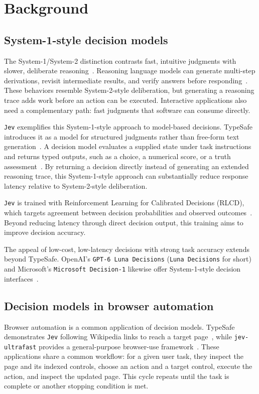 \documentclass{article}
\DeclareRobustCommand{\modelname}[1]{\texttt{#1}}
\begin{document}
\section{Background}
\subsection{System-1-style decision models}
The System-1/System-2 distinction contrasts fast, intuitive judgments with slower, deliberate reasoning~\cite{kahneman2011}. Reasoning language models can generate multi-step derivations, revisit intermediate results, and verify answers before responding~\cite{deepseek2025r1,wei2022cot}. These behaviors resemble System-2-style deliberation, but generating a reasoning trace adds work before an action can be executed. Interactive applications also need a complementary path: fast judgments that software can consume directly.

\modelname{Jev} exemplifies this System-1-style approach to model-based decisions. TypeSafe introduces it as a model for structured judgments rather than free-form text generation~\cite{almeida2026jev}. A decision model evaluates a supplied state under task instructions and returns typed outputs, such as a choice, a numerical score, or a truth assessment~\cite{typesafe2026}. By returning a decision directly instead of generating an extended reasoning trace, this System-1-style approach can substantially reduce response latency relative to System-2-style deliberation. 

\modelname{Jev} is trained with Reinforcement Learning for Calibrated Decisions (RLCD), which targets agreement between decision probabilities and observed outcomes~\cite{almeida2026jev}. Beyond reducing latency through direct decision output, this training aims to improve decision accuracy. 

The appeal of low-cost, low-latency decisions with strong task accuracy extends beyond TypeSafe. OpenAI's \modelname{GPT-6 Luna Decisions} (\modelname{Luna Decisions} for short) and Microsoft's \modelname{Microsoft Decision-1} likewise offer System-1-style decision interfaces~\cite{openai2026decisions,srivastava2026decision}.

\subsection{Decision models in browser automation}
Browser automation is a common application of decision models. TypeSafe demonstrates \modelname{Jev} following Wikipedia links to reach a target page~\cite{almeida2026jev}, while \texttt{jev-ultrafast} provides a general-purpose browser-use framework~\cite{jevultrafast2026}. These applications share a common workflow: for a given user task, they inspect the page and its indexed controls, choose an action and a target control, execute the action, and inspect the updated page. This cycle repeats until the task is complete or another stopping condition is met.
\end{document}

